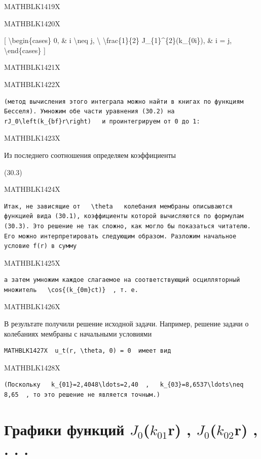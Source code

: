 \documentclass[
]{article}
\begin{document}
MATHBLK1419X

MATHBLK1420X

{[} \textbackslash begin\{cases\} 0, \& i \textbackslash neq j,
\textbackslash{} \textbackslash frac\{1\}\{2\}
J\_\{1\}\^{}\{2\}(k\_\{0i\}), \& i = j, \textbackslash end\{cases\} {]}

MATHBLK1421X

MATHBLK1422X

\begin{verbatim}
(метод вычисления этого интеграла можно найти в книгах по функциям Бесселя). Умножим обе части уравнения (30.2) на   rJ_0\left(k_{bf}r\right)   и проинтегрируем от 0 до 1:
\end{verbatim}

MATHBLK1423X

Из последнего соотношения определяем коэффициенты

(30.3)

MATHBLK1424X

\begin{verbatim}
Итак, не зависящие от   \theta   колебания мембраны описываются функцией вида (30.1), коэффициенты которой вычисляются по формулам (30.3). Это решение не так сложно, как могло бы показаться читателю. Его можно интерпретировать следующим образом. Разложим начальное условие f(r) в сумму
\end{verbatim}

MATHBLK1425X

\begin{verbatim}
а затем умножим каждое слагаемое на соответствующий осцилляторный множитель   \cos{(k_{0m}ct)}  , т. е.
\end{verbatim}

MATHBLK1426X

В результате получили решение исходной задачи. Например, решение задачи
о колебаниях мембраны с начальными условиями

\begin{verbatim}
MATHBLK1427X  u_t(r, \theta, 0) = 0  имеет вид
\end{verbatim}

MATHBLK1428X

\begin{verbatim}
(Поскольку   k_{01}=2,4048\ldots=2,40  ,   k_{03}=8,6537\ldots\neq 8,65  , то это решение не является точным.)
\end{verbatim}

\section{\texorpdfstring{Графики функций \(J_{0}\)(\(k_{01}\)r) ,
\(J_{0}\)(\(k_{02}\)r) , . .
.}{Графики функций J\_\{0\}(k\_\{01\}r) , J\_\{0\}(k\_\{02\}r) , . . .}}\label{ux433ux440ux430ux444ux438ux43aux438-ux444ux443ux43dux43aux446ux438ux439-j_0k_01r-j_0k_02r-.-.-.}
\end{document}

